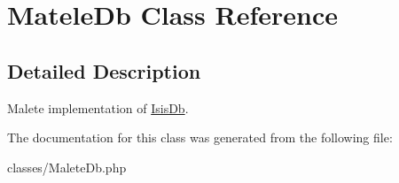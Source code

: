 \hypertarget{classMateleDb}{
\section{MateleDb Class Reference}
\label{classMateleDb}
}


\subsection{Detailed Description}
Malete implementation of \hyperlink{interfaceIsisDb}{IsisDb}. 

The documentation for this class was generated from the following file:\begin{DoxyCompactItemize}
\item 
classes/MaleteDb.php\end{DoxyCompactItemize}
